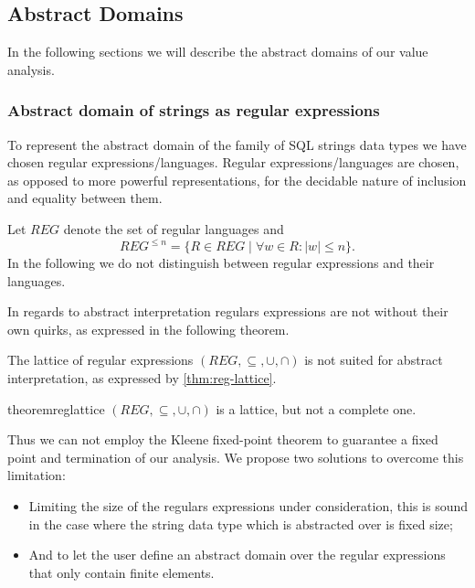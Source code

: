 \subsection{Abstract Domains}\label{subsec:abstract-domains}


In the following sections we will describe the abstract domains of our value analysis.

\subsubsection{Abstract domain of strings as regular expressions}\label{subsubsec:abstract_domains_strings}

To represent the abstract domain of the family of SQL strings data types we have chosen regular expressions/languages.
Regular expressions/languages are chosen, as opposed to more powerful representations, for the decidable nature of inclusion and equality between them.

Let $REG$ denote the set of regular languages and
\begin{equation*}
    REG^{\leq n} = \{R \in REG \mid \forall w \in R : |w| \leq n\}.
\end{equation*}
In the following we do not distinguish between regular expressions and their languages.

In regards to abstract interpretation regulars expressions are not without their own quirks, as expressed in the following theorem.

The lattice of regular expressions $(REG, \subseteq, \cup, \cap)$ is not suited for abstract interpretation, as expressed by \autoref{thm:reg-lattice}.

\begin{restatable}{theorem}{reglattice}\label{thm:reg-lattice}
    $(REG, \subseteq, \cup, \cap)$ is a lattice, but not a complete one.
\end{restatable}

Thus we can not employ the Kleene fixed-point theorem to guarantee a fixed point and termination of our analysis.
We propose two solutions to overcome this limitation:
\begin{itemize}
    \item Limiting the size of the regulars expressions under consideration, this is sound in the case where the string data type which is abstracted over is fixed size;
    \item And to let the user define an abstract domain over the regular expressions that only contain finite elements.
\end{itemize}

